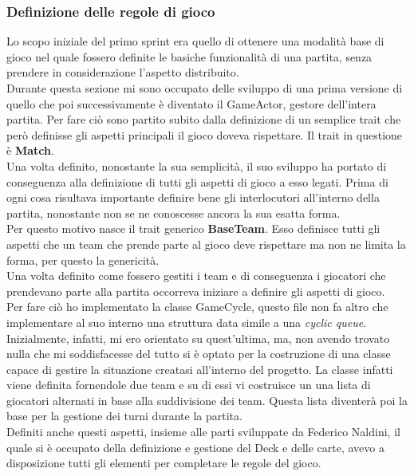 	\subsubsection{Definizione delle regole di gioco}
	  Lo scopo iniziale del primo sprint era quello di ottenere una modalità base di gioco nel quale fossero definite le basiche funzionalità di una partita, senza prendere in considerazione l'aspetto distribuito.
	  \\
	  Durante questa sezione mi sono occupato delle sviluppo di una prima versione di quello che poi successivamente è diventato il GameActor, gestore dell'intera partita. 
	  Per fare ciò sono partito subito dalla definizione di un semplice trait che però definisse gli aspetti principali il gioco doveva rispettare. 
	  Il trait in questione è \textbf{Match}.\\
	  Una volta definito, nonostante la sua semplicità, il suo sviluppo ha portato di conseguenza alla definizione di tutti gli aspetti di gioco a esso legati. 
	  Prima di ogni cosa risultava importante definire bene gli interlocutori all'interno della partita, nonostante non se ne conoscesse ancora la sua esatta forma. \\
	  Per questo motivo nasce il trait generico \textbf{BaseTeam}. Esso definisce tutti gli aspetti che un team che prende parte al gioco deve rispettare ma non ne limita la forma, per questo la genericità. \\
	  Una volta definito come fossero gestiti i team e di conseguenza i giocatori che prendevano parte alla partita occorreva iniziare a definire gli aspetti di gioco.\\
	  Per fare ciò ho implementato la classe GameCycle, questo file non fa altro che implementare al suo interno una struttura data simile a una \textit{cyclic queue}. Inizialmente, infatti, mi ero orientato su quest'ultima, ma, non avendo trovato nulla che mi soddisfacesse del tutto si è optato per la costruzione di una classe capace di gestire la situazione creatasi all'interno del progetto. 
	  La classe infatti viene definita fornendole due team e su di essi vi costruisce un una lista di giocatori alternati in base alla suddivisione dei team. Questa lista diventerà poi la base per la gestione dei turni durante la partita. 
	  \\
	  Definiti anche questi aspetti, insieme alle parti sviluppate da Federico Naldini, il quale si è occupato della definizione e gestione del Deck e delle carte, avevo a disposizione tutti gli elementi per completare le regole del gioco. 
